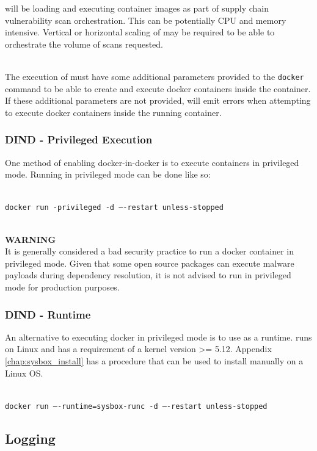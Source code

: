 \cxflowplusplus will be loading and executing container images as part of supply chain vulnerability scan
orchestration.  This can be potentially CPU and memory intensive.  Vertical or horizontal scaling
of \cxflowplusplus may be required to be able to orchestrate the volume of scans requested.

\noindent\\The execution of \cxflowplusplus must have some additional parameters provided to the
\texttt{docker} command to be able to create and execute docker containers inside the \cxflowplusplus
container.  If these additional parameters are not provided, \cxflowplusplus will emit errors when
attempting to execute docker containers inside the running container.

\subsubsection{DIND - Privileged Execution}

One method of enabling docker-in-docker is to execute containers in privileged mode.
Running \cxflowplusplus in privileged mode can be done like so:

\noindent\\\texttt{docker run -privileged -d ----restart unless-stopped \cxflowplusplustag}

\noindent\\\textbf{WARNING}
\noindent\\It is generally considered a bad security practice to run a docker container in privileged mode.
Given that some open source packages can execute malware payloads during dependency resolution, it is not
advised to run in privileged mode for production purposes.

\subsubsection{DIND - \sysbox Runtime}

An alternative to executing docker in privileged mode is to use \sysbox as a runtime.  \sysbox runs on Linux
and has a requirement of a kernel version >= 5.12.  Appendix \ref{chap:sysbox_install} has
a procedure that can be used to install \sysbox manually on a Linux OS.

\noindent\\\texttt{docker run ----runtime=sysbox-runc -d ----restart unless-stopped \cxflowplusplustag}

\subsection{Logging}


